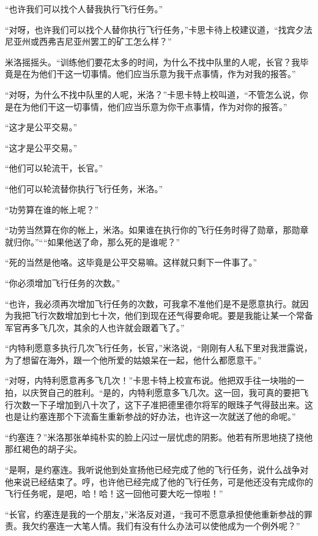     “也许我们可以找个人替我执行飞行任务。”

    “对呀，也许我们可以找个人替你执行飞行任务，”卡思卡待上校建议道，“找宾夕法尼亚州或西弗吉尼亚州罢工的矿工怎么样？”

    米洛摇摇头。“训练他们要花太多的时间，为什么不找中队里的人呢，长官？我毕竟是在为他们干这一切事情。他们应当乐意为我干点事情，作为对我的报答。”
 


    “对呀，为什么不找中队里的人呢，米洛？”卡思卡特上校叫道，“不管怎么说，你是在为他们干这一切事情，他们应当乐意为你干点事情，作为对你的报答。”

    “这才是公平交易。”

    “这才是公平交易。”

    “他们可以轮流干，长官。”

    “他们可以轮流替你执行飞行任务，米洛。”

    “功劳算在谁的帐上呢？”

    “功劳当然算在你的帐上，米洛。如果谁在执行你的飞行任务时得了勋章，那勋章就归你。”““如果他送了命，那么死的是谁呢？”

    “死的当然是他咯。这毕竟是公平交易嘛。这样就只剩下一件事了。”

    “你必须增加飞行任务的次数。”

    “也许，我必须再次增加飞行任务的次数，可我拿不准他们是不是愿意执行。就因为我把飞行次数增加到七十次，他们到现在还气得要命呢。要是我能让某一个常备军官再多飞几次，其余的人也许就会跟着飞了。”

    “内特利愿意多执行几次飞行任务，长官，”米洛说，“刚刚有人私下里对我泄露说，为了想留在海外，跟一个他所爱的姑娘呆在一起，他什么都愿意干。”

    “对呀，内特利愿意再多飞几次！”卡思卡特上校宣布说。他把双手往一块啪的一拍，以庆贺自己的胜利。“是的，内特利愿意多飞几次。这一回，我可真的要把飞行次数一下子增加到八十次了，这下子准把德里德尔将军的眼珠子气得鼓出来。这也是让约塞连那个下流畜生重新参战的好办法，也许这一次就送了他的命呢。”

    “约塞连？”米洛那张单纯朴实的脸上闪过一层忧虑的阴影。他若有所思地挠了挠他那红褐色的胡子尖。

    “是啊，是约塞连。我听说他到处宣扬他已经完成了他的飞行任务，说什么战争对他来说已经结束了。哼，也许他已经完成了他的飞行任务，可是他还没有完成你的飞行任务呢，是吧，哈！哈！这一回他可要大吃一惊啦！”

    “长官，约塞连是我的一个朋友，”米洛反对道，“我可不愿意承担使他重新参战的罪责。我欠约塞连一大笔人情。我们有没有什么办法可以使他成为一个例外呢？”

